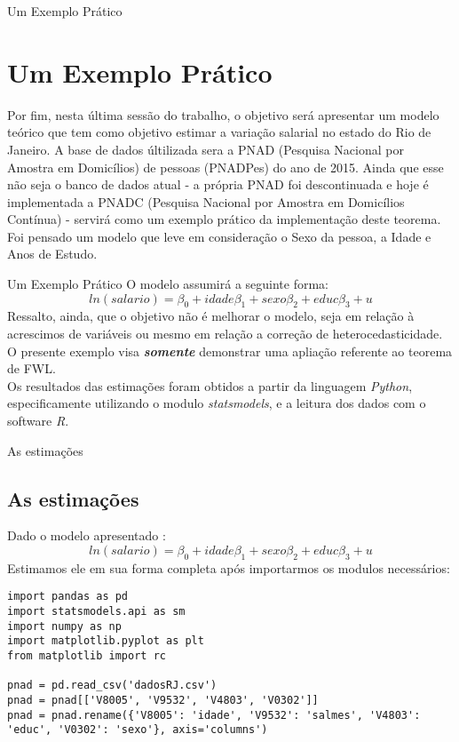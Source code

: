 \documentclass[11pt]{beamer}
\begin{document}
\begin{frame}{Um Exemplo Prático}
\section{Um Exemplo Prático}

Por fim, nesta última sessão do trabalho, o objetivo será apresentar um modelo teórico que tem como objetivo estimar a variação salarial no estado do Rio de Janeiro. A base de dados últilizada sera a PNAD (Pesquisa Nacional por Amostra em Domicílios) de pessoas (PNADPes) do ano de 2015. Ainda que esse não seja o banco de dados atual - a própria PNAD foi descontinuada e hoje é implementada a PNADC (Pesquisa Nacional por Amostra em Domicílios Contínua) - servirá como um exemplo prático da implementação deste teorema. Foi pensado um modelo que leve em consideração o Sexo da pessoa, a Idade e Anos de Estudo.  

\end{frame}

\begin{frame}{Um Exemplo Prático}
O modelo assumirá a seguinte forma:
$$ln(salario) = \beta_{0} + idade\beta_{1} + sexo\beta_{2} + educ\beta_{3} + u$$
Ressalto, ainda, que o objetivo não é melhorar o modelo, seja em relação à acrescimos de variáveis ou mesmo em relação a correção de heterocedasticidade. O presente exemplo visa \textit{\textbf{somente}} demonstrar uma apliação referente ao teorema de FWL.\\
Os resultados das estimações foram obtidos a partir da linguagem \textit{Python}, especificamente utilizando o modulo \textit{statsmodels}, e a leitura dos dados com o software \textit{R}.\\

\end{frame}

\begin{frame}[fragile]{As estimações}
\subsection{As estimações}

Dado o modelo apresentado :
$$ln(salario) = \beta_{0} + idade\beta_{1} + sexo\beta_{2} + educ\beta_{3} + u$$
Estimamos ele em sua forma completa após importarmos os modulos necessários:
\begin{lstlisting}
import pandas as pd
import statsmodels.api as sm
import numpy as np
import matplotlib.pyplot as plt
from matplotlib import rc

pnad = pd.read_csv('dadosRJ.csv')
pnad = pnad[['V8005', 'V9532', 'V4803', 'V0302']]
pnad = pnad.rename({'V8005': 'idade', 'V9532': 'salmes', 'V4803': 'educ', 'V0302': 'sexo'}, axis='columns')

\end{lstlisting}

\end{frame}
\end{document}
